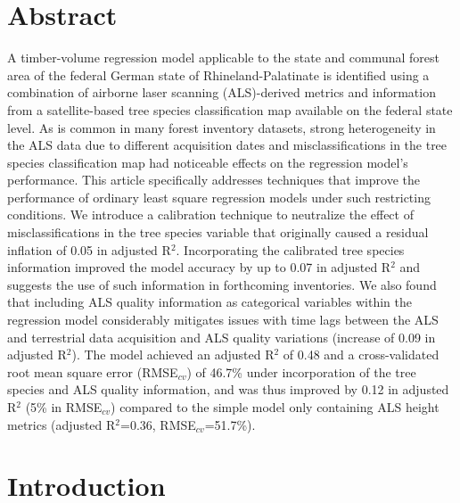 \section*{Abstract}
\label{chap:regmod:Abstract}
A timber-volume regression model applicable to the state and communal forest area of the federal German state of Rhineland-Palatinate is identified using a combination of airborne laser scanning (ALS)-derived metrics and information from a satellite-based tree species classification map available on the federal state level. As is common in many forest inventory datasets, strong heterogeneity in the ALS data due to different acquisition dates and misclassifications in the tree species classification map had noticeable effects on the regression model's performance. This article specifically addresses techniques that improve the performance of ordinary least square regression models under such restricting conditions. We introduce a calibration technique to neutralize the effect of misclassifications in the tree species variable that originally caused a residual inflation of 0.05 in adjusted R$^2$. Incorporating the calibrated tree species information improved the model accuracy by up to 0.07 in adjusted R$^2$ and suggests the use of such information in forthcoming inventories. We also found that including ALS quality information as categorical variables within the regression model considerably mitigates issues with time lags between the ALS and terrestrial data acquisition and ALS quality variations (increase of 0.09 in adjusted R$^2$). The model achieved an adjusted R$^2$ of 0.48 and a cross-validated root mean square error (RMSE$_{cv}$) of 46.7\% under incorporation of the tree species and ALS quality information, and was thus improved by 0.12 in adjusted R$^2$ (5\% in RMSE$_{cv}$) compared to the simple model only containing ALS height metrics (adjusted R$^2$=0.36, RMSE$_{cv}$=51.7\%).



\section{Introduction}
\label{sec:intro}

